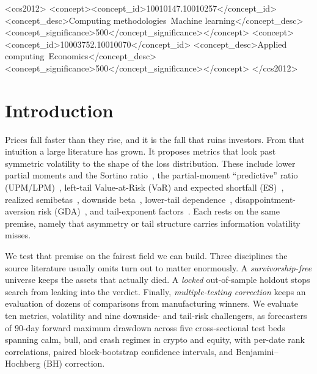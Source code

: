 \documentclass[sigconf,anonymous,nonacm]{acmart}
\begin{document}
\begin{CCSXML}
<ccs2012>
<concept><concept_id>10010147.10010257</concept_id>
<concept_desc>Computing methodologies~Machine learning</concept_desc>
<concept_significance>500</concept_significance></concept>
<concept><concept_id>10003752.10010070</concept_id>
<concept_desc>Applied computing~Economics</concept_desc>
<concept_significance>500</concept_significance></concept>
</ccs2012>
\end{CCSXML}


\maketitle

\section{Introduction}
Prices fall faster than they rise, and it is the fall that ruins investors. From
that intuition a large literature has grown. It proposes metrics that look past
symmetric volatility to the shape of the loss distribution. These include
lower partial moments and the Sortino ratio~\cite{bawa1975,fishburn1977,sortino1991},
the partial-moment ``predictive'' ratio (UPM/LPM)~\cite{violenawrocki2016}, left-tail
Value-at-Risk (VaR) and expected shortfall (ES)~\cite{rockafellar2000,atilgan2020}, realized
semibetas~\cite{bpq2022}, downside beta~\cite{ang2006,leviwelch2020}, lower-tail
dependence~\cite{chabiyo2018}, disappointment-aversion risk (GDA)~\cite{faragotedongap2018},
and tail-exponent factors~\cite{kellyjiang2014}. Each rests on the same premise, namely
that asymmetry or tail structure carries information volatility misses.

We test that premise on the fairest field we can build. Three disciplines the
source literature usually omits turn out to matter enormously. A
\emph{survivorship-free} universe keeps the assets that actually died. A
\emph{locked} out-of-sample holdout stops search from leaking into the verdict. Finally,
\emph{multiple-testing correction} keeps an evaluation of dozens of comparisons from
manufacturing winners. We evaluate ten metrics, volatility and nine downside- and
tail-risk challengers, as forecasters of $90$-day forward
maximum drawdown across five cross-sectional test beds spanning calm, bull, and
crash regimes in crypto and equity, with per-date rank correlations, paired
block-bootstrap confidence intervals, and Benjamini--Hochberg (BH) correction.
\end{document}
